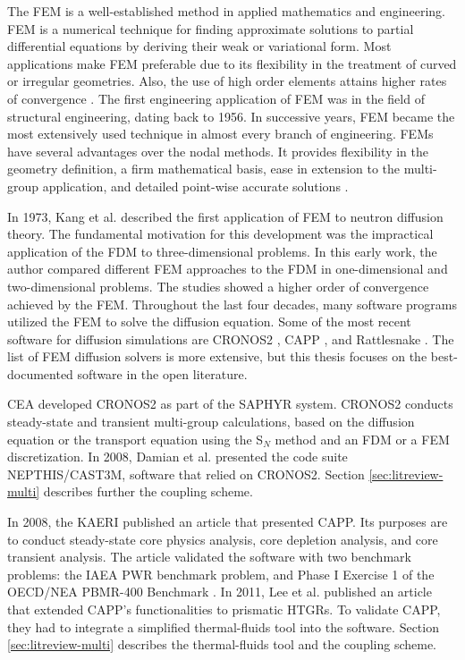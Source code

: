 The FEM is a well-established method in applied mathematics and engineering.
FEM is a numerical technique for finding approximate solutions to partial differential equations by deriving their weak or variational form.
Most applications make \gls{FEM} preferable due to its flexibility in the treatment of curved or irregular geometries.
Also, the use of high order elements attains higher rates of convergence \cite{cavdar_finite_2004}.
The first engineering application of \gls{FEM} was in the field of structural engineering, dating back to 1956.
In successive years, \gls{FEM} became the most extensively used technique in almost every branch of engineering.
\glspl{FEM} have several advantages over the nodal methods.
It provides flexibility in the geometry definition, a firm mathematical basis, ease in extension to the multi-group application, and detailed point-wise accurate solutions \cite{lee_development_2008}.

In 1973, Kang et al. \cite{kang_finite_1973} described the first application of \gls{FEM} to neutron diffusion theory.
The fundamental motivation for this development was the impractical application of the \gls{FDM} to three-dimensional problems.
In this early work, the author compared different \gls{FEM} approaches to the \gls{FDM} in one-dimensional and two-dimensional problems.
The studies showed a higher order of convergence achieved by the \gls{FEM}.
Throughout the last four decades, many software programs utilized the \gls{FEM} to solve the diffusion equation.
Some of the most recent software for diffusion simulations are CRONOS2 \cite{lautard_cronos_1990}, \gls{CAPP} \cite{lee_development_2011}, and Rattlesnake \cite{wang_rattlesnake_2019}.
The list of \gls{FEM} diffusion solvers is more extensive, but this thesis focuses on the best-documented software in the open literature.

\gls{CEA} developed CRONOS2 \cite{lautard_cronos_1990} as part of the SAPHYR system.
CRONOS2 conducts steady-state and transient multi-group calculations, based on the diffusion equation or the transport equation using the S$_N$ method and an FDM or a FEM discretization.
In 2008, Damian et al. \cite{damian_vhtr_2008} presented the code suite NEPTHIS\cite{cavalier_presentation_2005}/CAST3M\cite{studer_cast3marcturus_2007}, software that relied on CRONOS2.
Section \ref{sec:litreview-multi} describes further the coupling scheme.

In 2008, the \gls{KAERI} published an article \cite{lee_development_2008} that presented CAPP.
Its purposes are to conduct steady-state core physics analysis, core depletion analysis, and core transient analysis.
The article validated the software with two benchmark problems: the IAEA PWR benchmark problem, and Phase I Exercise 1 of the OECD/NEA PBMR-400 Benchmark \cite{reitsma_oecd-neansc_2008}.
In 2011, Lee et al. published an article \cite{lee_development_2011} that extended CAPP's functionalities to prismatic HTGRs.
To validate CAPP, they had to integrate a simplified thermal-fluids tool into the software.
Section \ref{sec:litreview-multi} describes the thermal-fluids tool and the coupling scheme.

